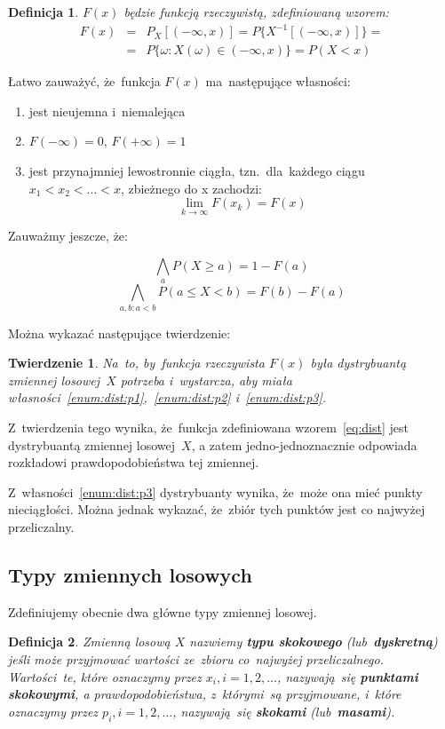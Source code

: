 \documentclass[10pt,a4paper]{article}
\newtheorem{definition}{Definicja}[section]
\newtheorem{theorem}{Twierdzenie}[section]
\numberwithin{equation}{subsection}
\begin{document}
\begin{definition}
  $F(x)$ będzie funkcją rzeczywistą, zdefiniowaną wzorem:
  \begin{eqnarray}
    \label{eq:dist}
    F(x) & = & P_X[(-\infty, x)] = P\{X^{-1}[(-\infty, x)]\} =
    \nonumber \\
    & = &  P\{\omega: X(\omega)\in(-\infty,x)\} = P(X<x)
  \end{eqnarray}
\end{definition}

Łatwo zauważyć, że~funkcja $F(x)$ ma~następujące własności:

\begin{enumerate}
  \item \label{enum:dist:p1} jest nieujemna i~niemalejąca
  \item \label{enum:dist:p2} $F(-\infty) = 0$, $F(+\infty) = 1$
  \item \label{enum:dist:p3} jest przynajmniej lewostronnie ciągła,
    tzn.~dla~każdego ciągu $x_1<x_2<\dotsc<x$, zbieżnego do x zachodzi:
    \[
      \lim_{k\rightarrow\infty}F(x_k) = F(x)
    \]
\end{enumerate}

Zauważmy jeszcze, że:

\[
  \bigwedge_a P(X\geq a) = 1 - F(a)
\]
\[
  \bigwedge_{a,b: a<b} P(a\leq X<b) = F(b) - F(a)
\]

Można wykazać następujące twierdzenie:

\begin{theorem}
  Na~to, by~funkcja rzeczywista $F(x)$ była dystrybuantą zmiennej losowej~$X$
  potrzeba i~wystarcza, aby miała własności~\ref{enum:dist:p1},~\ref{enum:dist:p2}
  i~\ref{enum:dist:p3}.
\end{theorem}

Z~twierdzenia tego wynika, że~funkcja zdefiniowana wzorem~\ref{eq:dist} jest
dystrybuantą zmiennej losowej~$X$, a zatem jedno-jednoznacznie odpowiada
rozkładowi prawdopodobieństwa tej zmiennej.

Z~własności~\ref{enum:dist:p3} dystrybuanty wynika, że~może ona mieć punkty
nieciągłości. Można jednak wykazać, że~zbiór tych punktów jest co najwyżej
przeliczalny.

\subsection{Typy zmiennych losowych}
Zdefiniujemy obecnie dwa główne typy zmiennej losowej.

\begin{definition}
  Zmienną losową $X$ nazwiemy \textbf{typu skokowego} (lub~\textbf{dyskretną})
  jeśli może przyjmować wartości ze~zbioru co~najwyżej przeliczalnego.
  Wartości~te, które oznaczymy przez $x_i, i=1,2,\dotsc$, nazywają~się
  \textbf{punktami skokowymi}, a prawdopodobieństwa, z~którymi~są przyjmowane,
  i~które oznaczymy przez $p_i, i=1,2,\dotsc$, nazywają~się \textbf{skokami}
  (lub~\textbf{masami}).
\end{definition}
\end{document}
